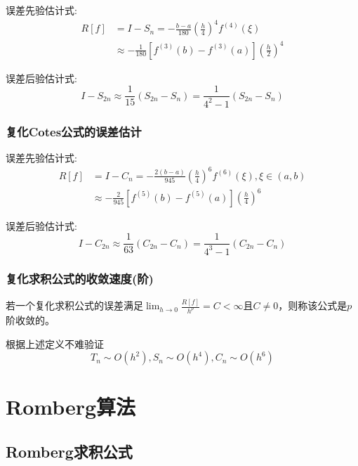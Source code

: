 误差先验估计式:
\begin{align*}
    R[f] &= I-S_n = -\frac{b-a}{180}(\frac{h}{4})^4f^{(4)}(\xi ) \\
    &\approx -\frac{1}{180}[f^{(3)}(b)-f^{(3)}(a)](\frac{h}{2})^4
\end{align*}

误差后验估计式:
\begin{equation*}
    I-S_{2n} \approx \frac{1}{15}(S_{2n}-S_n) = \frac{1}{4^2-1}(S_{2n}-S_n)
\end{equation*}

\subsubsection{复化Cotes公式的误差估计}

误差先验估计式:
\begin{align*}
    R[f] &= I-C_n = -\frac{2(b-a)}{945}(\frac{h}{4})^6f^{(6)}(\xi ),\xi \in (a,b) \\
    &\approx -\frac{2}{945}[f^{(5)}(b)-f^{(5)}(a)](\frac{h}{4})^6
\end{align*}

误差后验估计式:
\begin{equation*}
    I-C_{2n} \approx \frac{1}{63}(C_{2n}-C_n) = \frac{1}{4^3-1}(C_{2n}-C_n)
\end{equation*}

\subsubsection{复化求积公式的收敛速度(阶)}
\begin{definition}[$p$阶收敛]
    若一个复化求积公式的误差满足$\lim_{h\rightarrow 0}\frac{R[f]}{h^p} = C<\infty $且$C\neq 0$，则称该公式是$p$阶收敛的。
\end{definition}
\begin{notice}
    根据上述定义不难验证
    \begin{equation}
        T_n\sim O(h^2),S_n\sim O(h^4),C_n\sim O(h^6)
    \end{equation}
\end{notice}

\section{Romberg算法}

\subsection{Romberg求积公式}

